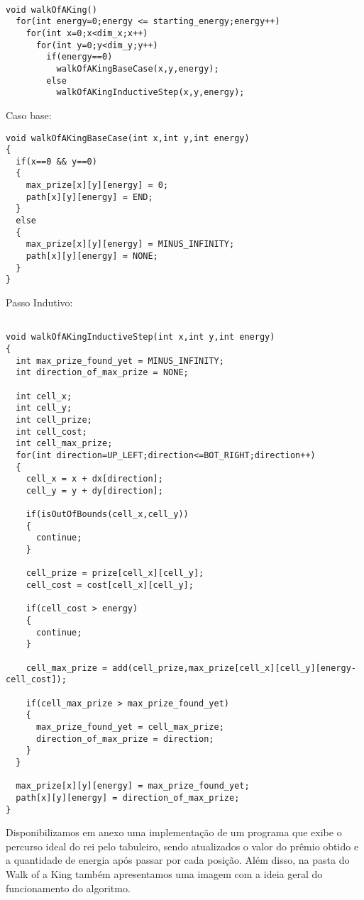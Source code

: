 \documentclass[12pt]{article}
\begin{document}
\begin{lstlisting}

void walkOfAKing()
  for(int energy=0;energy <= starting_energy;energy++)
    for(int x=0;x<dim_x;x++)
      for(int y=0;y<dim_y;y++)
        if(energy==0)
          walkOfAKingBaseCase(x,y,energy);
        else
          walkOfAKingInductiveStep(x,y,energy);
\end{lstlisting}
Caso base:
\begin{lstlisting}
void walkOfAKingBaseCase(int x,int y,int energy)
{
  if(x==0 && y==0)
  {
    max_prize[x][y][energy] = 0;
    path[x][y][energy] = END;
  }
  else
  {
    max_prize[x][y][energy] = MINUS_INFINITY;
    path[x][y][energy] = NONE;  
  } 
}
\end{lstlisting}
Passo Indutivo:
\begin{lstlisting}

void walkOfAKingInductiveStep(int x,int y,int energy)
{
  int max_prize_found_yet = MINUS_INFINITY;
  int direction_of_max_prize = NONE;

  int cell_x;
  int cell_y;
  int cell_prize;
  int cell_cost;
  int cell_max_prize;
  for(int direction=UP_LEFT;direction<=BOT_RIGHT;direction++)
  {
    cell_x = x + dx[direction];
    cell_y = y + dy[direction];

    if(isOutOfBounds(cell_x,cell_y))
    {
      continue;
    }

    cell_prize = prize[cell_x][cell_y];
    cell_cost = cost[cell_x][cell_y];

    if(cell_cost > energy)
    {
      continue;
    }

    cell_max_prize = add(cell_prize,max_prize[cell_x][cell_y][energy-cell_cost]);

    if(cell_max_prize > max_prize_found_yet)
    {
      max_prize_found_yet = cell_max_prize;
      direction_of_max_prize = direction;
    }
  }

  max_prize[x][y][energy] = max_prize_found_yet;
  path[x][y][energy] = direction_of_max_prize;
}
\end{lstlisting}

\indent Disponibilizamos em anexo uma implementação de um programa que exibe o percurso ideal do rei pelo tabuleiro, sendo atualizados o valor do prêmio obtido e a quantidade de energia após passar por cada posição. Além disso, na pasta do Walk of a King também apresentamos uma imagem com a ideia geral do funcionamento do algoritmo.\\


\newpage
\end{document}
